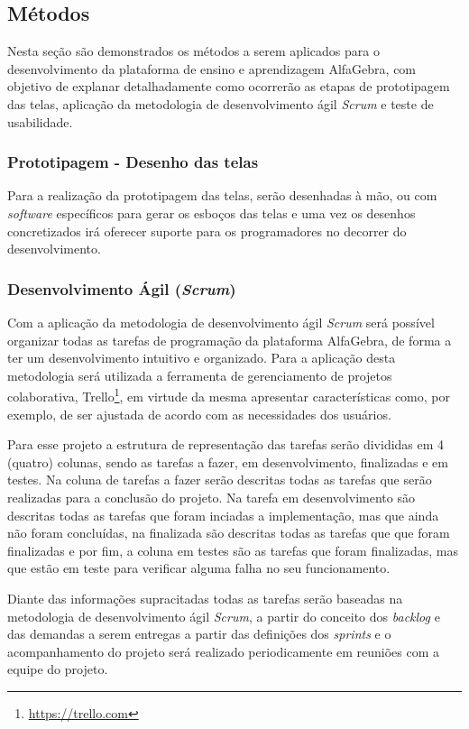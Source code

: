 \subsection{Métodos}
\noindent Nesta seção são demonstrados os métodos a serem aplicados para o desenvolvimento da plataforma de ensino e aprendizagem AlfaGebra, com objetivo de explanar detalhadamente como ocorrerão as etapas de prototipagem das telas, aplicação da metodologia de desenvolvimento ágil \textit{Scrum} e teste de usabilidade.

\subsubsection{Prototipagem - Desenho das telas}
\noindent Para a realização da prototipagem das telas, serão desenhadas à mão, ou com \textit{software} específicos para gerar os esboços das telas e uma vez os desenhos concretizados irá oferecer suporte para os programadores no decorrer do desenvolvimento. 

\subsubsection{Desenvolvimento Ágil (\textit{Scrum})}
\noindent Com a aplicação da metodologia de desenvolvimento ágil \textit{Scrum} será possível organizar todas as tarefas de programação da plataforma AlfaGebra, de forma a ter um desenvolvimento intuitivo e organizado. Para a aplicação desta metodologia será utilizada a ferramenta de gerenciamento de projetos colaborativa, Trello\footnote[6]{\url{https://trello.com}}, em virtude da mesma apresentar características como, por exemplo, de ser ajustada de acordo com as necessidades dos usuários.

Para esse projeto a estrutura de representação das tarefas serão divididas em 4 (quatro) colunas, sendo as tarefas a fazer, em desenvolvimento, finalizadas e em testes. Na coluna de tarefas a fazer serão descritas todas as tarefas que serão realizadas para a conclusão do projeto. Na tarefa em desenvolvimento são descritas todas as tarefas que foram inciadas a implementação, mas que ainda não foram concluídas, na finalizada são descritas todas as tarefas que que foram finalizadas e por fim, a coluna em testes são as tarefas que foram finalizadas, mas que estão em teste para verificar alguma falha no seu funcionamento. 

Diante das informações supracitadas todas as tarefas serão baseadas na metodologia de desenvolvimento ágil \textit{Scrum}, a partir do conceito dos \textit{backlog} e das demandas a serem entregas a partir das definições dos \textit{sprints} e o acompanhamento do projeto será realizado periodicamente em reuniões com a equipe do projeto.

